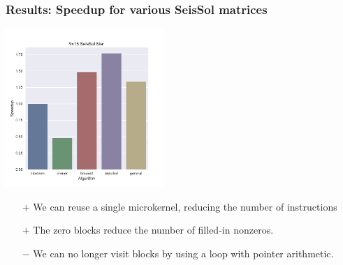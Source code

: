 \documentclass[9pt]{beamer}
\begin{document}
\begin{frame}[fragile]
  \frametitle{Results: Speedup for various SeisSol matrices}

  

  \centering
  \includegraphics[height=6cm]{images/seissol_comparison.pdf}

  \begin{itemize}
  \item[$+$] We can reuse a single microkernel, reducing the number of instructions
  \item[$+$] The zero blocks reduce the number of filled-in nonzeros.
  \item[$-$] We can no longer visit blocks by using a loop with pointer arithmetic.
  \end{itemize}
\end{frame}
\end{document}
